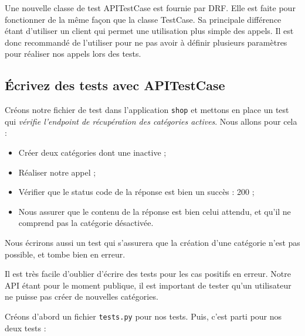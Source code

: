 Une nouvelle classe de test {\color{monOrange}APITestCase}  est fournie par DRF. Elle est faite pour fonctionner de la même façon que la classe {\color{monOrange}TestCase}. Sa principale différence étant d’utiliser un client qui permet une utilisation plus simple des appels. Il est donc recommandé de l’utiliser pour ne pas avoir à définir plusieurs paramètres pour réaliser nos appels lors des tests.

\subsection{Écrivez des tests avec APITestCase}
Créons notre fichier de test dans l’application {\tt shop}  et mettons en place un test qui {\em vérifie l’endpoint de récupération des catégories actives}. Nous allons pour cela :
\begin{itemize}
\item Créer deux catégories dont une inactive ;
\item Réaliser notre appel ;
\item Vérifier que le status code de la réponse est bien un succès : 200 ; 
\item Nous assurer que le contenu de la réponse est bien celui attendu, et qu'il ne comprend pas la catégorie désactivée.
\end{itemize}
Nous écrirons aussi un test qui s’assurera que la création d’une catégorie n’est pas possible, et tombe bien en erreur.
\begin{theorem}
Il est très facile d’oublier d’écrire des tests pour les cas positifs en erreur. Notre API étant pour le moment publique, il est important de tester qu’un utilisateur ne puisse pas créer de nouvelles catégories.
\end{theorem}
Créons d'abord un fichier  {\tt tests.py}  pour nos tests. Puis, c’est parti pour nos deux tests :
